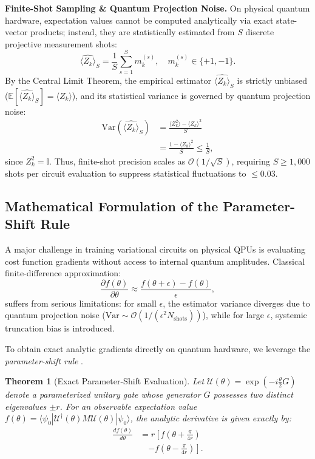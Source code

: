 \documentclass[journal]{IEEEtran}
\newtheorem{theorem}{Theorem}
\begin{document}
\textbf{Finite-Shot Sampling \& Quantum Projection Noise.} On physical quantum hardware, expectation values cannot be computed analytically via exact state-vector products; instead, they are statistically estimated from $S$ discrete projective measurement shots:
\begin{equation}
\widehat{\langle Z_k \rangle}_S = \frac{1}{S} \sum_{s=1}^S m_k^{(s)}, \quad m_k^{(s)} \in \{+1, -1\}.
\label{eq:shot_estimator}
\end{equation}
By the Central Limit Theorem, the empirical estimator $\widehat{\langle Z_k \rangle}_S$ is strictly unbiased ($\mathbb{E}[\widehat{\langle Z_k \rangle}_S] = \langle Z_k \rangle$), and its statistical variance is governed by quantum projection noise:
\begin{align}
\mathrm{Var}\left(\widehat{\langle Z_k \rangle}_S\right) &= \frac{\langle Z_k^2 \rangle - \langle Z_k \rangle^2}{S} \nonumber \\
&= \frac{1 - \langle Z_k \rangle^2}{S} \le \frac{1}{S},
\label{eq:shot_noise_variance}
\end{align}
since $Z_k^2 = \mathbb{I}$. Thus, finite-shot precision scales as $\mathcal{O}(1/\sqrt{S})$, requiring $S \ge 1{,}000$ shots per circuit evaluation to suppress statistical fluctuations to $\le 0.03$.

\subsection{Mathematical Formulation of the Parameter-Shift Rule}
A major challenge in training variational circuits on physical QPUs is evaluating cost function gradients without access to internal quantum amplitudes. Classical finite-difference approximation:
\begin{equation}
\frac{\partial f(\theta)}{\partial \theta} \approx \frac{f(\theta + \epsilon) - f(\theta)}{\epsilon},
\label{eq:finite_difference}
\end{equation}
suffers from serious limitations: for small $\epsilon$, the estimator variance diverges due to quantum projection noise ($\mathrm{Var} \sim \mathcal{O}(1/(\epsilon^2 N_{\mathrm{shots}}))$), while for large $\epsilon$, systemic truncation bias is introduced.

To obtain exact analytic gradients directly on quantum hardware, we leverage the \textit{parameter-shift rule} \cite{mitarai2018quantum, schuld2019evaluating}.

\begin{theorem}[Exact Parameter-Shift Evaluation]
Let $\mathcal{U}(\theta) = \exp(-i \frac{\theta}{2} G)$ denote a parameterized unitary gate whose generator $G$ possesses two distinct eigenvalues $\pm r$. For an observable expectation value $f(\theta) = \langle \psi_0 | \mathcal{U}^\dagger(\theta) M \mathcal{U}(\theta) | \psi_0 \rangle$, the analytic derivative is given exactly by:
\begin{align}
\frac{d f(\theta)}{d\theta} &= r \left[ f\left(\theta + \frac{\pi}{4r}\right) \right. \nonumber \\
&\quad \left. - f\left(\theta - \frac{\pi}{4r}\right) \right].
\label{eq:param_shift_theorem}
\end{align}
\end{theorem}
\end{document}
